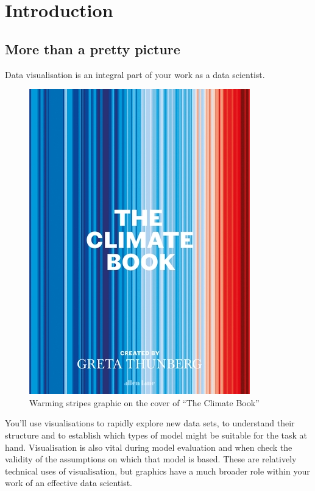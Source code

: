 \documentclass[
  12pt,
]{book}
\begin{document}
\hypertarget{introduction-3}{%
\section{Introduction}\label{introduction-3}}

\hypertarget{more-than-a-pretty-picture}{%
\subsection{More than a pretty picture}\label{more-than-a-pretty-picture}}

Data visualisation is an integral part of your work as a data scientist.

\begin{figure}
\centering
\includegraphics{images/303-data-visualisation/the-climate-book-jacket.jpg}
\caption{Warming stripes graphic on the cover of ``The Climate Book''}
\end{figure}

You'll use visualisations to rapidly explore new data sets, to understand their structure and to establish which types of model might be suitable for the task at hand. Visualisation is also vital during model evaluation and when check the validity of the assumptions on which that model is based. These are relatively technical uses of visualisation, but graphics have a much broader role within your work of an effective data scientist.
\end{document}
